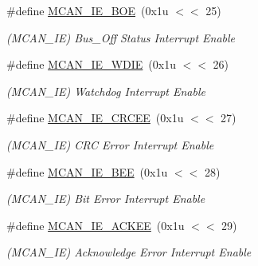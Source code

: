 \begin{DoxyCompactItemize}
\mbox{\label{group__SAME70__MCAN_ga1bd88452eeeec0756c853de694f1cf48}} 
\#define \mbox{\hyperlink{group__SAME70__MCAN_ga1bd88452eeeec0756c853de694f1cf48}{M\+C\+A\+N\+\_\+\+I\+E\+\_\+\+B\+OE}}~(0x1u $<$$<$ 25)
\begin{DoxyCompactList}\small\item\em (M\+C\+A\+N\+\_\+\+IE) Bus\+\_\+\+Off Status Interrupt Enable \end{DoxyCompactList}\item 
\mbox{\label{group__SAME70__MCAN_gae27466326bb66d9071c0bedc7254cb21}} 
\#define \mbox{\hyperlink{group__SAME70__MCAN_gae27466326bb66d9071c0bedc7254cb21}{M\+C\+A\+N\+\_\+\+I\+E\+\_\+\+W\+D\+IE}}~(0x1u $<$$<$ 26)
\begin{DoxyCompactList}\small\item\em (M\+C\+A\+N\+\_\+\+IE) Watchdog Interrupt Enable \end{DoxyCompactList}\item 
\mbox{\label{group__SAME70__MCAN_ga808bdd43fac86550b4389ad0cd5f3cf4}} 
\#define \mbox{\hyperlink{group__SAME70__MCAN_ga808bdd43fac86550b4389ad0cd5f3cf4}{M\+C\+A\+N\+\_\+\+I\+E\+\_\+\+C\+R\+C\+EE}}~(0x1u $<$$<$ 27)
\begin{DoxyCompactList}\small\item\em (M\+C\+A\+N\+\_\+\+IE) C\+RC Error Interrupt Enable \end{DoxyCompactList}\item 
\mbox{\label{group__SAME70__MCAN_gaa131fdd4cadf2cd6134ca458ac309bd9}} 
\#define \mbox{\hyperlink{group__SAME70__MCAN_gaa131fdd4cadf2cd6134ca458ac309bd9}{M\+C\+A\+N\+\_\+\+I\+E\+\_\+\+B\+EE}}~(0x1u $<$$<$ 28)
\begin{DoxyCompactList}\small\item\em (M\+C\+A\+N\+\_\+\+IE) Bit Error Interrupt Enable \end{DoxyCompactList}\item 
\mbox{\label{group__SAME70__MCAN_gacf79d8ed4fdf65678cba49483c6f5d93}} 
\#define \mbox{\hyperlink{group__SAME70__MCAN_gacf79d8ed4fdf65678cba49483c6f5d93}{M\+C\+A\+N\+\_\+\+I\+E\+\_\+\+A\+C\+K\+EE}}~(0x1u $<$$<$ 29)
\begin{DoxyCompactList}\small\item\em (M\+C\+A\+N\+\_\+\+IE) Acknowledge Error Interrupt Enable \end{DoxyCompactList}\item 
$$
\end{DoxyCompactItemize}
